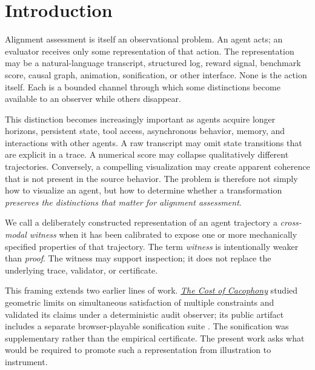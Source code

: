 \documentclass[11pt]{article}
\begin{document}
\begin{abstract}
The broader motivation comes from a lineage spanning Newton's cross-modal proportional mapping in \emph{Opticks}, auditory display and critical-band perception, ecoacoustic sonification, information visualization, observer-relative symbolic projection, generative style transformation, and recent agent-generated music visualization. These examples motivate a general question for agentic alignment: \emph{when the representation changes, which distinctions survive?}
\end{abstract}

\section{Introduction}
Alignment assessment is itself an observational problem. An agent acts; an evaluator receives only some representation of that action. The representation may be a natural-language transcript, structured log, reward signal, benchmark score, causal graph, animation, sonification, or other interface. None is the action itself. Each is a bounded channel through which some distinctions become available to an observer while others disappear.

This distinction becomes increasingly important as agents acquire longer horizons, persistent state, tool access, asynchronous behavior, memory, and interactions with other agents. A raw transcript may omit state transitions that are explicit in a trace. A numerical score may collapse qualitatively different trajectories. Conversely, a compelling visualization may create apparent coherence that is not present in the source behavior. The problem is therefore not simply how to visualize an agent, but how to determine whether a transformation \emph{preserves the distinctions that matter for alignment assessment}.

We call a deliberately constructed representation of an agent trajectory a \emph{cross-modal witness} when it has been calibrated to expose one or more mechanically specified properties of that trajectory. The term \emph{witness} is intentionally weaker than \emph{proof}. The witness may support inspection; it does not replace the underlying trace, validator, or certificate.

This framing extends two earlier lines of work. \href{https://github.com/PaulTiffany/cost}{\emph{The Cost of Cacophony}} studied geometric limits on simultaneous satisfaction of multiple constraints and validated its claims under a deterministic audit observer; its public artifact includes a separate browser-playable sonification suite \citep{tiffany2026cacophony}. The sonification was supplementary rather than the empirical certificate. The present work asks what would be required to promote such a representation from illustration to instrument.
\end{document}
